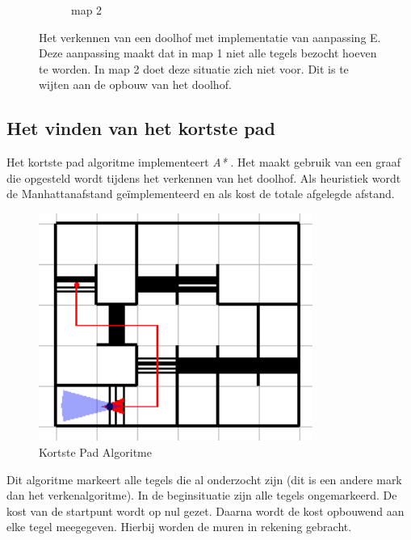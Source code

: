 \documentclass[tt3]{penoverslag}
\begin{document}
\begin{figure}
\begin{subfigure}[hb]{0.36\textwidth}
                \caption{map 2}
        \end{subfigure}
 \caption[Het verkennen van een doolhof]{Het verkennen van een doolhof met implementatie van aanpassing E. Deze aanpassing maakt dat in map 1 niet alle tegels bezocht hoeven te worden. In map 2 doet deze situatie zich niet voor. Dit is te wijten aan de opbouw van het doolhof.}
\label{fig:resultVerkenE}
\end{figure}

\subsection{Het vinden van het kortste pad} %
\label{ssec:AlgoKortsteP}

Het kortste pad algoritme implementeert \textit{A*} \cite{A*}. Het maakt gebruik van een graaf die opgesteld wordt tijdens het verkennen van het doolhof. Als heuristiek wordt de Manhattanafstand \cite{manhattan} ge\"implementeerd en als kost de totale afgelegde afstand.

\begin{figure}[tbp]
\begin{center}
    \includegraphics[width=0.8\textwidth]{kortstepadvisual}
    \caption{Kortste Pad Algoritme}
	\label{fig:kortstepad}
\end{center}
\end{figure}

Dit algoritme markeert alle tegels die al onderzocht zijn (dit is een andere mark dan het verkenalgoritme). In de beginsituatie zijn alle tegels ongemarkeerd. De kost van de startpunt wordt op nul gezet. Daarna wordt de kost opbouwend aan elke tegel meegegeven. Hierbij worden de muren in rekening gebracht.
\end{document}
